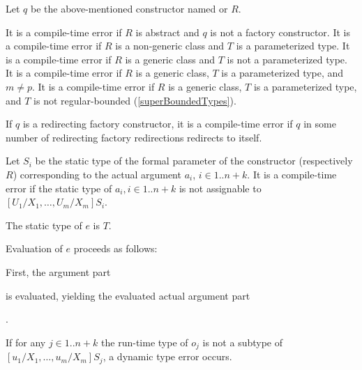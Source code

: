 \documentclass[makeidx]{article}
\begin{document}
\LMHash{}%
Let $q$ be the above-mentioned constructor named  or $R$.

\LMHash{}%
It is a compile-time error if $R$ is abstract
and $q$ is not a factory constructor.
It is a compile-time error if $R$ is a non-generic class
and $T$ is a parameterized type.
It is a compile-time error if $R$ is a generic class
and $T$ is not a parameterized type.
It is a compile-time error if $R$ is a generic class,
$T$ is a parameterized type, and $m \not= p$.
It is a compile-time error if $R$ is a generic class,
$T$ is a parameterized type,
and $T$ is not regular-bounded
(\ref{superBoundedTypes}).

\LMHash{}%
If $q$ is a redirecting factory constructor,
it is a compile-time error if $q$ in some number of
redirecting factory redirections redirects to itself.

\LMHash{}%
Let $S_i$ be the static type of
the formal parameter of the constructor  (respectively $R$)
corresponding to the actual argument $a_i$, $i \in 1 .. n+k$.
It is a compile-time error if the static type of
$a_i, i \in 1 .. n + k$
is not assignable to $[U_1/X_1, \ldots, U_m/X_m]S_i$.

\LMHash{}%
The static type of $e$ is $T$.

\LMHash{}%
Evaluation of $e$ proceeds as follows:

\LMHash{}%
First, the argument part


\noindent
is evaluated, yielding the evaluated actual argument part

.

\noindent
{}
If for any
$j \in 1 .. n + k$
the run-time type of $o_j$ is not a subtype of
$[u_1/X_1, \ldots, u_m/X_m]S_j$,
a dynamic type error occurs.
\end{document}
